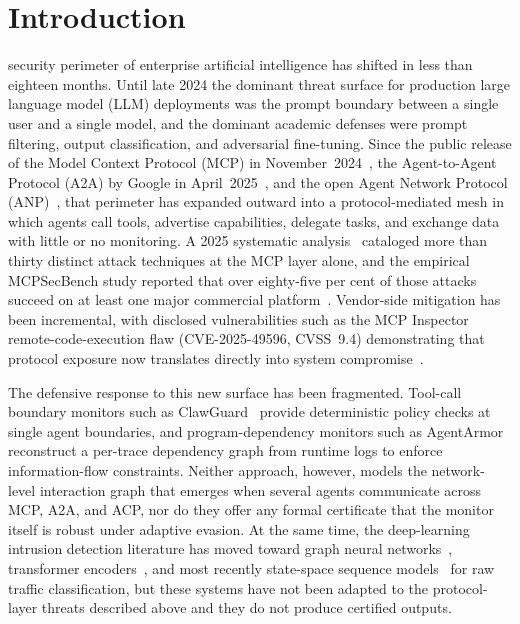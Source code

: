 \documentclass[journal,10pt,twocolumn]{IEEEtran}
\begin{document}
\maketitle
\IEEEdisplaynontitleabstractindextext
\IEEEpeerreviewmaketitle

\section{Introduction}
 security perimeter of enterprise artificial intelligence has shifted in less than eighteen months. Until late 2024 the dominant threat surface for production large language model (LLM) deployments was the prompt boundary between a single user and a single model, and the dominant academic defenses were prompt filtering, output classification, and adversarial fine-tuning. Since the public release of the Model Context Protocol (MCP) in November~2024~\cite{Anthropic2024MCP}, the Agent-to-Agent Protocol (A2A) by Google in April~2025~\cite{Google2025A2A}, and the open Agent Network Protocol (ANP)~\cite{Yan2025ANP}, that perimeter has expanded outward into a protocol-mediated mesh in which agents call tools, advertise capabilities, delegate tasks, and exchange data with little or no monitoring. A 2025 systematic analysis~\cite{Hou2025MCP} cataloged more than thirty distinct attack techniques at the MCP layer alone, and the empirical MCPSecBench study reported that over eighty-five per cent of those attacks succeed on at least one major commercial platform~\cite{Yang2025MCPSec}. Vendor-side mitigation has been incremental, with disclosed vulnerabilities such as the MCP Inspector remote-code-execution flaw (CVE-2025-49596, CVSS~9.4) demonstrating that protocol exposure now translates directly into system compromise~\cite{Qualys2025CVE49596}.

The defensive response to this new surface has been fragmented. Tool-call boundary monitors such as ClawGuard~\cite{Zhao2026ClawGuard} provide deterministic policy checks at single agent boundaries, and program-dependency monitors such as AgentArmor~\cite{Wang2025AgentArmor} reconstruct a per-trace dependency graph from runtime logs to enforce information-flow constraints. Neither approach, however, models the network-level interaction graph that emerges when several agents communicate across MCP, A2A, and ACP, nor do they offer any formal certificate that the monitor itself is robust under adaptive evasion. At the same time, the deep-learning intrusion detection literature has moved toward graph neural networks~\cite{Lo2022EGraphSAGE,Caville2022AnomalE}, transformer encoders~\cite{Wu2022RTIDS,Ullah2024IDSINT}, and most recently state-space sequence models~\cite{Wang2025NetMamba,Gu2023Mamba} for raw traffic classification, but these systems have not been adapted to the protocol-layer threats described above and they do not produce certified outputs.
\end{document}
